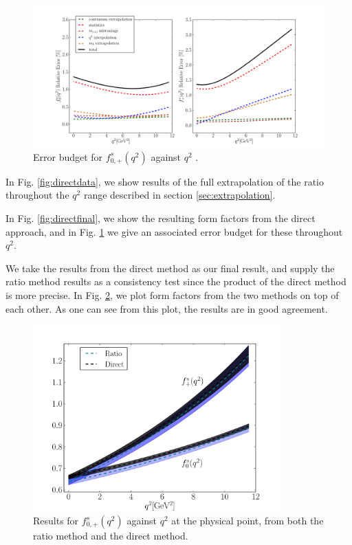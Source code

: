 \begin{figure}[htb!]
  \hspace{-85pt}
  \includegraphics[width=1.4\textwidth]{images/BsDs/direct/errorbudget.pdf}
  \caption{ Error budget for $f_{0,+}^s(q^2)$ against $q^2$ \label{fig:directerrorbudget}.}
\end{figure}

In Fig. \ref{fig:directdata}, we show results of the full extrapolation of the ratio throughout the $q^2$ range described in section \ref{sec:extrapolation}.

In Fig. \ref{fig:directfinal}, we show the resulting form factors from the direct approach, and in Fig. \ref{fig:directerrorbudget} we give an associated error budget for these throughout $q^2$.

We take the results from the direct method as our final result, and supply the ratio method results as a consistency test since the product of the direct method is more precise. In Fig. \ref{fig:ratiovsdirect}, we plot form factors from the two methods on top of each other. As one can see from this plot, the results are in good agreement.

\begin{figure}[htb!]
  \begin{center}
  \includegraphics[width=0.85\textwidth]{images/BsDs/ratio_vs_direct.pdf}
  \caption{ Results for $f_{0,+}^s(q^2)$ against $q^2$ at the physical point, from both the ratio method and the direct method. \label{fig:ratiovsdirect}}
    \end{center}
\end{figure}

